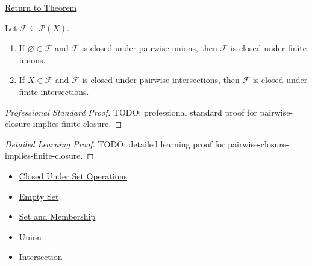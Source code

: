 \newpage
{}
\label{prf:pairwise-closure-implies-finite-closure}

\begin{remark*}[Return]
\hyperref[thm:pairwise-closure-implies-finite-closure]{Return to Theorem}
\end{remark*}

\begin{theorem*}
Let \(\mathcal F\subseteq\mathcal P(X)\).
\begin{enumerate}[label=(\roman*)]
\item If \(\varnothing\in\mathcal F\) and \(\mathcal F\) is closed under
      pairwise unions, then \(\mathcal F\) is closed under finite unions.
\item If \(X\in\mathcal F\) and \(\mathcal F\) is closed under pairwise
      intersections, then \(\mathcal F\) is closed under finite intersections.
\end{enumerate}
\end{theorem*}

\begin{proof}[Professional Standard Proof]
\LRAProofBodyStart
TODO: professional standard proof for pairwise-closure-implies-finite-closure.
\end{proof}

\begin{proof}[Detailed Learning Proof]
\LRAProofBodyStart
TODO: detailed learning proof for pairwise-closure-implies-finite-closure.
\end{proof}

\begin{remark*}
\end{remark*}

\begin{dependencies}
\begin{itemize}
  \item \hyperref[def:closed-under-set-operation-vocabulary]{Closed Under Set Operations}
  \item \hyperref[def:empty-set]{Empty Set}
  \item \hyperref[def:set-membership]{Set and Membership}
  \item \hyperref[def:union]{Union}
  \item \hyperref[def:intersection]{Intersection}
\end{itemize}
\end{dependencies}

\clearpage
